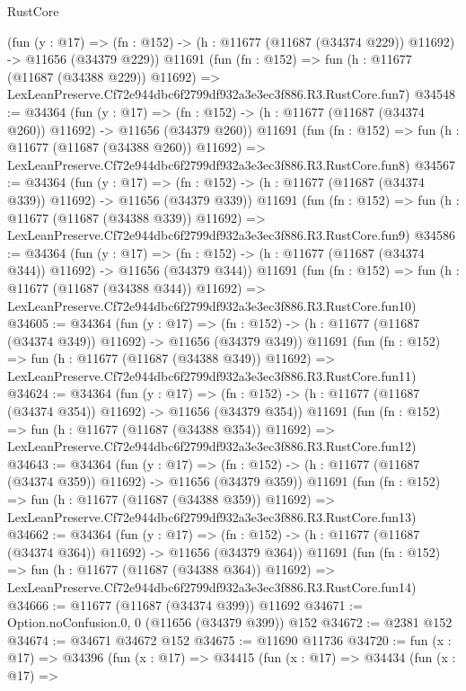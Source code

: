 \begin{lexlean}{RustCore}
\begin{coremodule}
    (fun (y : @17) =>
    (fn : @152) -> (h : @11677 (@11687 (@34374 @229)) @11692) -> @11656 (@34379 @229))
    @11691
    (fun (fn : @152) =>
    fun (h : @11677 (@11687 (@34388 @229)) @11692) =>
    LexLeanPreserve.Cf72e944dbc6f2799df932a3e3ec3f886.R3.RustCore.fun7)
@34548 := @34364
    (fun (y : @17) =>
    (fn : @152) -> (h : @11677 (@11687 (@34374 @260)) @11692) -> @11656 (@34379 @260))
    @11691
    (fun (fn : @152) =>
    fun (h : @11677 (@11687 (@34388 @260)) @11692) =>
    LexLeanPreserve.Cf72e944dbc6f2799df932a3e3ec3f886.R3.RustCore.fun8)
@34567 := @34364
    (fun (y : @17) =>
    (fn : @152) -> (h : @11677 (@11687 (@34374 @339)) @11692) -> @11656 (@34379 @339))
    @11691
    (fun (fn : @152) =>
    fun (h : @11677 (@11687 (@34388 @339)) @11692) =>
    LexLeanPreserve.Cf72e944dbc6f2799df932a3e3ec3f886.R3.RustCore.fun9)
@34586 := @34364
    (fun (y : @17) =>
    (fn : @152) -> (h : @11677 (@11687 (@34374 @344)) @11692) -> @11656 (@34379 @344))
    @11691
    (fun (fn : @152) =>
    fun (h : @11677 (@11687 (@34388 @344)) @11692) =>
    LexLeanPreserve.Cf72e944dbc6f2799df932a3e3ec3f886.R3.RustCore.fun10)
@34605 := @34364
    (fun (y : @17) =>
    (fn : @152) -> (h : @11677 (@11687 (@34374 @349)) @11692) -> @11656 (@34379 @349))
    @11691
    (fun (fn : @152) =>
    fun (h : @11677 (@11687 (@34388 @349)) @11692) =>
    LexLeanPreserve.Cf72e944dbc6f2799df932a3e3ec3f886.R3.RustCore.fun11)
@34624 := @34364
    (fun (y : @17) =>
    (fn : @152) -> (h : @11677 (@11687 (@34374 @354)) @11692) -> @11656 (@34379 @354))
    @11691
    (fun (fn : @152) =>
    fun (h : @11677 (@11687 (@34388 @354)) @11692) =>
    LexLeanPreserve.Cf72e944dbc6f2799df932a3e3ec3f886.R3.RustCore.fun12)
@34643 := @34364
    (fun (y : @17) =>
    (fn : @152) -> (h : @11677 (@11687 (@34374 @359)) @11692) -> @11656 (@34379 @359))
    @11691
    (fun (fn : @152) =>
    fun (h : @11677 (@11687 (@34388 @359)) @11692) =>
    LexLeanPreserve.Cf72e944dbc6f2799df932a3e3ec3f886.R3.RustCore.fun13)
@34662 := @34364
    (fun (y : @17) =>
    (fn : @152) -> (h : @11677 (@11687 (@34374 @364)) @11692) -> @11656 (@34379 @364))
    @11691
    (fun (fn : @152) =>
    fun (h : @11677 (@11687 (@34388 @364)) @11692) =>
    LexLeanPreserve.Cf72e944dbc6f2799df932a3e3ec3f886.R3.RustCore.fun14)
@34666 := @11677 (@11687 (@34374 @399)) @11692
@34671 := Option.noConfusion.{0, 0} (@11656 (@34379 @399)) @152
@34672 := @2381 @152
@34674 := @34671 @34672 @152
@34675 := @11690 @11736
@34720 := fun (x : @17) =>
  @34396
    (fun (x : @17) =>
    @34415
      (fun (x : @17) =>
      @34434
        (fun (x : @17) =>

\end{coremodule}
\end{lexlean}
